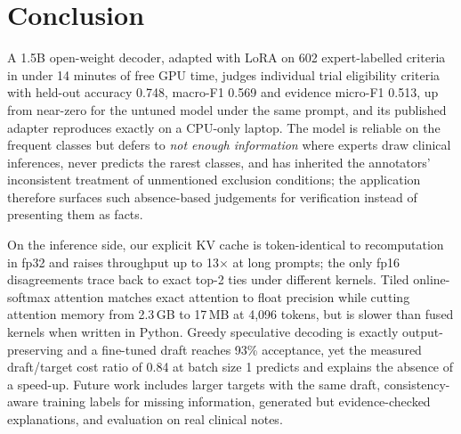 \section{Conclusion}
\label{sec:conclusion}

A 1.5B open-weight decoder, adapted with LoRA on 602 expert-labelled criteria in under 14 minutes of
free GPU time, judges individual trial eligibility criteria with held-out accuracy 0.748, macro-F1
0.569 and evidence micro-F1 0.513, up from near-zero for the untuned model under the same prompt,
and its published adapter reproduces exactly on a CPU-only laptop. The model is reliable on the
frequent classes but defers to \emph{not enough information} where experts draw clinical
inferences, never predicts the rarest classes, and has inherited the annotators' inconsistent
treatment of unmentioned exclusion conditions; the application therefore surfaces such absence-based
judgements for verification instead of presenting them as facts.

On the inference side, our explicit KV cache is token-identical to recomputation in fp32 and raises
throughput up to 13$\times$ at long prompts; the only fp16 disagreements trace back to exact
top-2 ties under different kernels. Tiled online-softmax attention matches exact attention to float
precision while cutting attention memory from 2.3\,GB to 17\,MB at 4,096 tokens, but is slower than
fused kernels when written in Python. Greedy speculative decoding is exactly output-preserving and a
fine-tuned draft reaches 93\% acceptance, yet the measured draft/target cost ratio of 0.84 at batch
size 1 predicts and explains the absence of a speed-up. Future work includes larger targets with the
same draft, consistency-aware training labels for missing information, generated but evidence-checked
explanations, and evaluation on real clinical notes.
